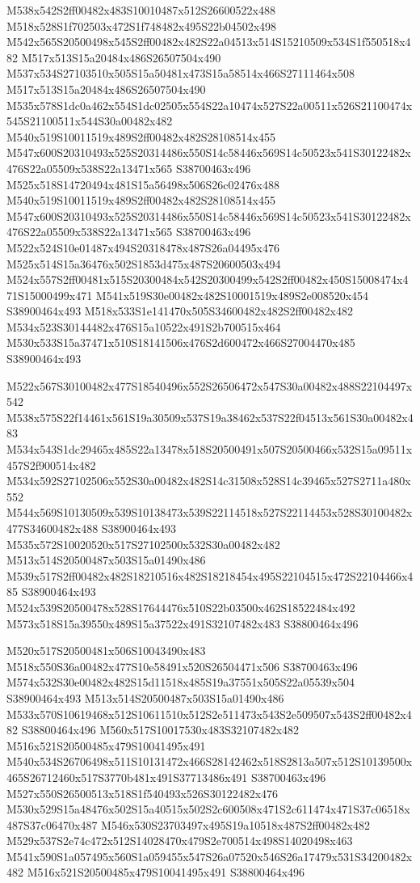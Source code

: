 \documentclass{article}
\begin{document}
\begin{multicols}{2}
M538x542S2ff00482x483S10010487x512S26600522x488 M518x528S1f702503x472S1f748482x495S22b04502x498 M542x565S20500498x545S2ff00482x482S22a04513x514S15210509x534S1f550518x482 M517x513S15a20484x486S26507504x490 M537x534S27103510x505S15a50481x473S15a58514x466S27111464x508 M517x513S15a20484x486S26507504x490 M535x578S1dc0a462x554S1dc02505x554S22a10474x527S22a00511x526S21100474x545S21100511x544S30a00482x482 M540x519S10011519x489S2ff00482x482S28108514x455 M547x600S20310493x525S20314486x550S14c58446x569S14c50523x541S30122482x476S22a05509x538S22a13471x565 S38700463x496 M525x518S14720494x481S15a56498x506S26c02476x488 M540x519S10011519x489S2ff00482x482S28108514x455 M547x600S20310493x525S20314486x550S14c58446x569S14c50523x541S30122482x476S22a05509x538S22a13471x565 S38700463x496 M522x524S10e01487x494S20318478x487S26a04495x476 M525x514S15a36476x502S1853d475x487S20600503x494 M524x557S2ff00481x515S20300484x542S20300499x542S2ff00482x450S15008474x471S15000499x471 M541x519S30e00482x482S10001519x489S2e008520x454 S38900464x493 M518x533S1e141470x505S34600482x482S2ff00482x482 M534x523S30144482x476S15a10522x491S2b700515x464 M530x533S15a37471x510S18141506x476S2d600472x466S27004470x485 S38900464x493

M522x567S30100482x477S18540496x552S26506472x547S30a00482x488S22104497x542 M538x575S22f14461x561S19a30509x537S19a38462x537S22f04513x561S30a00482x483 M534x543S1dc29465x485S22a13478x518S20500491x507S20500466x532S15a09511x457S2f900514x482 M534x592S27102506x552S30a00482x482S14c31508x528S14c39465x527S2711a480x552 M544x569S10130509x539S10138473x539S22114518x527S22114453x528S30100482x477S34600482x488 S38900464x493 M535x572S10020520x517S27102500x532S30a00482x482 M513x514S20500487x503S15a01490x486 M539x517S2ff00482x482S18210516x482S18218454x495S22104515x472S22104466x485 S38900464x493 M524x539S20500478x528S17644476x510S22b03500x462S18522484x492 M573x518S15a39550x489S15a37522x491S32107482x483 S38800464x496

M520x517S20500481x506S10043490x483 M518x550S36a00482x477S10e58491x520S26504471x506 S38700463x496 M574x532S30e00482x482S15d11518x485S19a37551x505S22a05539x504 S38900464x493 M513x514S20500487x503S15a01490x486 M533x570S10619468x512S10611510x512S2e511473x543S2e509507x543S2ff00482x482 S38800464x496 M560x517S10017530x483S32107482x482 M516x521S20500485x479S10041495x491 M540x534S26706498x511S10131472x466S28142462x518S2813a507x512S10139500x465S26712460x517S3770b481x491S37713486x491 S38700463x496 M527x550S26500513x518S1f540493x526S30122482x476 M530x529S15a48476x502S15a40515x502S2c600508x471S2c611474x471S37c06518x487S37c06470x487 M546x530S23703497x495S19a10518x487S2ff00482x482 M529x537S2e74c472x512S14028470x479S2e700514x498S14020498x463 M541x590S1a057495x560S1a059455x547S26a07520x546S26a17479x531S34200482x482 M516x521S20500485x479S10041495x491 S38800464x496


\end{multicols}
\end{document}
